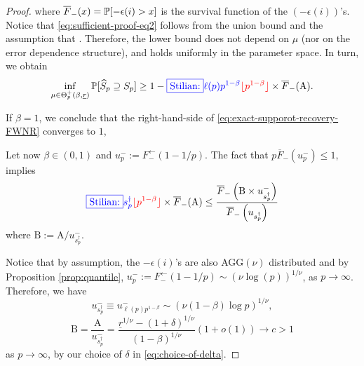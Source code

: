 \begin{proof}
where $\overline{F}_-(x) = \P[-\epsilon(i)>x]$ is the survival function of the $(-\epsilon(i))$'s.
Notice that \eqref{eq:sufficient-proof-eq2} follows from the union bound and the assumption 
that  . 
Therefore, the lower bound does not depend on $\mu$ (nor on the error dependence structure), and holds uniformly in the parameter space. In turn, we obtain 
\begin{equation} \label{eq:exact-supporot-recovery-FWNR}
    \inf_{\mu\in\Theta_p^+(\beta, \underline{r})} \P[\widehat{S}_p \supseteq S_p] \ge 1 - \stilian{\ell(p)p^{1-\beta}}{\lfloor p^{1-\beta} \rfloor} \times \overline{F}_-(\text{A}).
\end{equation}

If $\beta=1$, we conclude that the right-hand-side of \eqref{eq:exact-supporot-recovery-FWNR} 
converges to $1$, 

Let now $\beta\in (0,1)$ and $u_p^- :=  F_-^{\leftarrow}(1-1/p)$. 
The fact that $p\overline{F}_-(u_p^-) \le 1$, implies
\begin{equation}
    \stilian{s_p^\dagger}{\lfloor p^{1-\beta} \rfloor} \times \overline{F}_-(\text{A}) \le 
    \frac{\overline{F}_-\left(\text{B}\times{u_{s_p^\dagger}^-}\right)} {\overline{F}_-\left({u_{s_p^\dagger}}\right)} \label{eq:sufficient-proof-eq3}
\end{equation}
where $\text{B} := {\text{A}}/{u_{s_p^\dagger}^-}$.

Notice that by assumption, the $-\epsilon(i)$'s are also 
AGG$(\nu)$ distributed and by Proposition \ref{prop:quantile}, 
$u_p^{-}:= F_-^{\leftarrow}(1-1/p) \sim (\nu \log(p))^{1/\nu}$,
as $p\to\infty$. Therefore, we have
\begin{equation} \label{eq:sufficient-proof-eq4}
    u_{s_p^\dagger}^- \equiv u_{\ell(p)p^{1-\beta}}^-\sim \left(\nu(1-\beta)\log{p}\right)^{1/\nu},
\end{equation}
\begin{equation*}
\text{B} = \frac{\text{A}}{u_{s_p^\dagger}^-}
= \frac{\underline{r}^{1/\nu} - (1+\delta)^{1/\nu}}{(1-\beta)^{1/\nu}}\left(1+o(1)\right) \to c>1
\end{equation*}
as $p\to\infty$, by our choice of $\delta$ in \eqref{eq:choice-of-delta}.


\end{proof}
